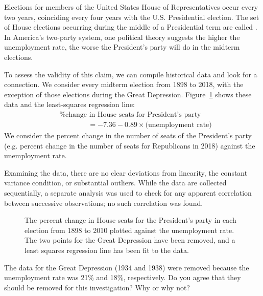 
Elections for members of the United States House
of Representatives occur every two years, coinciding
every four years with the U.S. Presidential election.
The set of House elections occurring during the middle
of a Presidential term are called
.
In America's two-party system, one political theory
suggests the higher the unemployment rate, the worse
the President's party will do in the midterm elections.

To assess the validity of this claim, we can compile
historical data and look for a connection.
We consider every midterm election from 1898 to 2018,
with the exception of those elections during the Great
Depression.
Figure~\ref{unemploymentAndChangeInHouse} shows these data
and the least-squares regression line: \vspace{-2mm}
\begin{align*}
&\text{\% change in House seats for President's party}  \\
&\qquad\qquad= -7.36 - 0.89 \times \text{(unemployment rate)}
\end{align*}
We consider the percent change in the number of seats
of the President's party (e.g. percent change in the number
of seats for Republicans in 2018) against the unemployment
rate.

Examining the data, there are no clear deviations from
linearity, the constant variance condition,
or substantial outliers.
While the data are collected sequentially, a separate analysis
was used to check for any apparent correlation between successive
observations;
no such correlation was found.

\begin{figure}[h]
  \centering
  \caption{The percent change in House seats for the
      President's party in each election from 1898 to 2010
      plotted against the unemployment rate.
      The two points for the Great Depression have been
      removed, and a least squares regression line has been
      fit to the data.}
  \label{unemploymentAndChangeInHouse}
\end{figure}

\begin{exercisewrap}
\begin{nexercise}
The data for the Great Depression (1934 and 1938) were removed
because the unemployment rate was 21\% and 18\%, respectively.
Do you agree that they should be removed for this investigation?
Why or why not?\footnotemark{}
\end{nexercise}
\end{exercisewrap}

